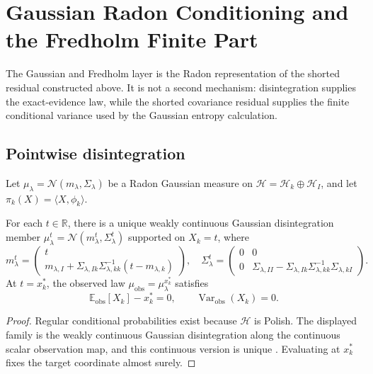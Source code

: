 \section{Gaussian Radon Conditioning and the Fredholm Finite Part}
\label{app:gaussian_fredholm}

The Gaussian and Fredholm layer is the Radon representation of the shorted
residual constructed above.  It is not a second mechanism: disintegration
supplies the exact-evidence law, while the shorted covariance residual supplies
the finite conditional variance used by the Gaussian entropy calculation.

\subsection{Pointwise disintegration}

Let $\mu_\lambda=\mathcal{N}(m_\lambda,\Sigma_\lambda)$ be a Radon Gaussian
measure on $\mathcal{H}=\mathcal{H}_k\oplus\mathcal{H}_I$, and let
$\pi_k(X)=\langle X,\phi_k\rangle$.

\begin{lemma}
\label{lem:disintegration}
For each $t\in\mathbb{R}$, there is a unique weakly continuous Gaussian
disintegration member
$\mu_\lambda^t=\mathcal{N}(m_\lambda^t,\Sigma_\lambda^t)$ supported on
$X_k=t$, where
\[
  m_\lambda^t=
  \begin{pmatrix}
    t\\
    m_{\lambda,I}
    +\Sigma_{\lambda,Ik}\Sigma_{\lambda,kk}^{-1}(t-m_{\lambda,k})
  \end{pmatrix},
  \quad
  \Sigma_\lambda^t=
  \begin{pmatrix}
    0&0\\
    0&\Sigma_{\lambda,II}
      -\Sigma_{\lambda,Ik}\Sigma_{\lambda,kk}^{-1}\Sigma_{\lambda,kI}
  \end{pmatrix}.
\]
At $t=x_k^*$, the observed law $\mu_{\mathrm{obs}}=\mu_\lambda^{x_k^*}$
satisfies
\[
  \mathbb{E}_{\mathrm{obs}}[X_k]-x_k^*=0,
  \qquad
  \operatorname{Var}_{\mathrm{obs}}(X_k)=0.
\]
\end{lemma}

\begin{proof}
Regular conditional probabilities exist because $\mathcal{H}$ is Polish.  The
displayed family is the weakly continuous Gaussian disintegration along the
continuous scalar observation map, and this continuous version is unique
\cite{bogachev1998gaussian,lagatta2013continuous}.  Evaluating at $x_k^*$ fixes
the target coordinate almost surely.
\end{proof}

